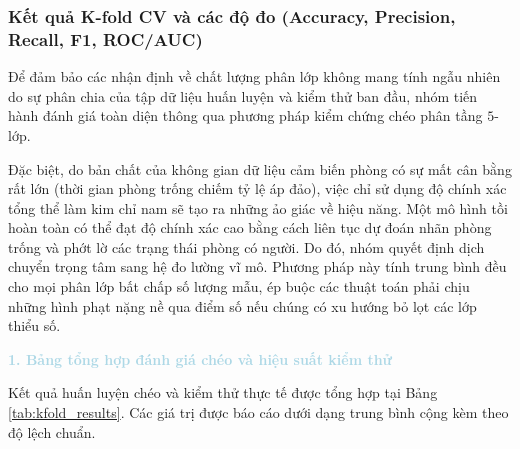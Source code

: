 \subsubsection{Kết quả K-fold CV và các độ đo (Accuracy, Precision, Recall, F1, ROC/AUC)}

Để đảm bảo các nhận định về chất lượng phân lớp không mang tính ngẫu nhiên do sự phân chia của tập dữ liệu huấn luyện và kiểm thử ban đầu, nhóm tiến hành đánh giá toàn diện thông qua phương pháp kiểm chứng chéo phân tầng $5$-lớp. 

Đặc biệt, do bản chất của không gian dữ liệu cảm biến phòng có sự mất cân bằng rất lớn (thời gian phòng trống chiếm tỷ lệ áp đảo), việc chỉ sử dụng độ chính xác tổng thể làm kim chỉ nam sẽ tạo ra những ảo giác về hiệu năng. Một mô hình tồi hoàn toàn có thể đạt độ chính xác cao bằng cách liên tục dự đoán nhãn phòng trống và phớt lờ các trạng thái phòng có người. Do đó, nhóm quyết định dịch chuyển trọng tâm sang hệ đo lường vĩ mô. Phương pháp này tính trung bình đều cho mọi phân lớp bất chấp số lượng mẫu, ép buộc các thuật toán phải chịu những hình phạt nặng nề qua điểm số nếu chúng có xu hướng bỏ lọt các lớp thiểu số.

\vspace{0.5em}
\noindent\textcolor{lightblue}{\textbf{1. Bảng tổng hợp đánh giá chéo và hiệu suất kiểm thử}}
\vspace{0.5em}

Kết quả huấn luyện chéo và kiểm thử thực tế được tổng hợp tại Bảng \ref{tab:kfold_results}. Các giá trị được báo cáo dưới dạng trung bình cộng kèm theo độ lệch chuẩn.

